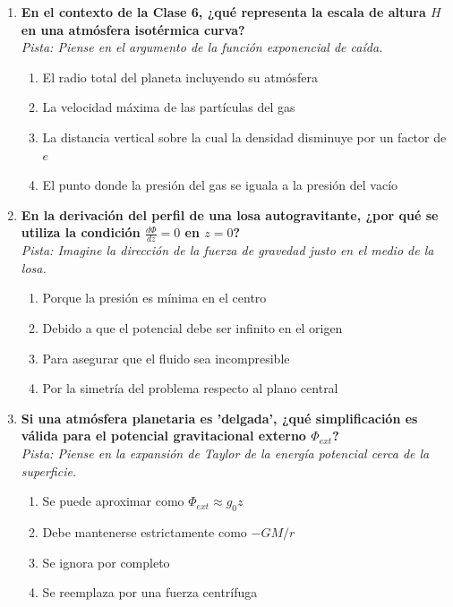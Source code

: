 \documentclass[12pt,a4paper]{article}
\begin{document}
\begin{enumerate}[label=\textbf{\arabic*.}, itemsep=1.5em]
\item \textbf{En el contexto de la Clase 6, ¿qué representa la escala de altura $H$ en una atmósfera isotérmica curva?} \\
\textit{Pista: Piense en el argumento de la función exponencial de caída.}
\begin{enumerate}[label=\alph*), leftmargin=*]
    \item El radio total del planeta incluyendo su atmósfera
    \item La velocidad máxima de las partículas del gas
    \item La distancia vertical sobre la cual la densidad disminuye por un factor de $e$
    \item El punto donde la presión del gas se iguala a la presión del vacío
\end{enumerate}

\item \textbf{En la derivación del perfil de una losa autogravitante, ¿por qué se utiliza la condición $\frac{d\Phi}{dz} = 0$ en $z=0$?} \\
\textit{Pista: Imagine la dirección de la fuerza de gravedad justo en el medio de la losa.}
\begin{enumerate}[label=\alph*), leftmargin=*]
    \item Porque la presión es mínima en el centro
    \item Debido a que el potencial debe ser infinito en el origen
    \item Para asegurar que el fluido sea incompresible
    \item Por la simetría del problema respecto al plano central
\end{enumerate}

\item \textbf{Si una atmósfera planetaria es 'delgada', ¿qué simplificación es válida para el potencial gravitacional externo $\Phi_{ext}$?} \\
\textit{Pista: Piense en la expansión de Taylor de la energía potencial cerca de la superficie.}
\begin{enumerate}[label=\alph*), leftmargin=*]
    \item Se puede aproximar como $\Phi_{ext} \approx g_0 z$
    \item Debe mantenerse estrictamente como $-GM/r$
    \item Se ignora por completo
    \item Se reemplaza por una fuerza centrífuga
\end{enumerate}


\end{enumerate}
\end{document}
